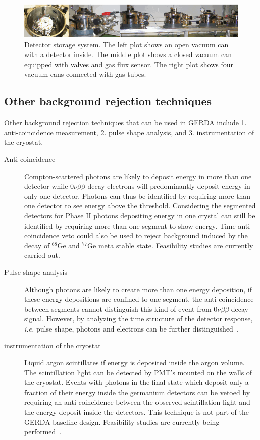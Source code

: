 \begin{figure}[tbhp]
  \centering
  \includegraphics[width=\textwidth]{storage}
  \caption{Detector storage system. The left plot shows an open vacuum     can with a detector inside. The middle plot shows a closed vacuum     can equipped with valves and gas flux sensor. The right plot shows     four vacuum cans connected with gas tubes.}
  \label{fig:store}
\end{figure}

\subsection{Other background rejection techniques}
\label{sec:gerda:anti}
Other background rejection techniques that can be used in GERDA include 1. anti-coincidence measurement, 2. pulse shape analysis, and 3. instrumentation of the cryostat.
\begin{description}
\item[Anti-coincidence] Compton-scattered photons are likely to   deposit energy in more than one detector while $0\nu\beta\beta$   decay electrons will predominantly deposit energy in only one   detector. Photons can thus be identified by requiring more than one   detector to see energy above the threshold. Considering the   segmented detectors for Phase II photons depositing energy in one   crystal can still be identified by requiring more than one segment   to show energy. Time anti-coincidence veto could also be used to   reject background induced by the decay of $^{68}$Ge and $^{77}$Ge   meta stable state. Feasibility studies are currently carried out.
\item[Pulse shape analysis] Although photons are likely to create more   than one energy deposition, if these energy depositions are confined   to one segment, the anti-coincidence between segments cannot   distinguish this kind of event from $0\nu\beta\beta$ decay signal.   However, by analyzing the time structure of the detector response,   \textit{i.e.} pulse shape, photons and electrons can be further   distinguished~\cite{Kev07}.
\item[instrumentation of the cryostat] Liquid argon scintillates if   energy is deposited inside the argon volume. The scintillation light   can be detected by PMT's mounted on the walls of the cryostat.   Events with photons in the final state which deposit only a fraction   of their energy inside the germanium detectors can be vetoed by   requiring an anti-coincidence between the observed scintillation   light and the energy deposit inside the detectors.  This technique   is not part of the GERDA baseline design. Feasibility studies are   currently being performed~\cite{Pei05, Orr06}.
\end{description}


